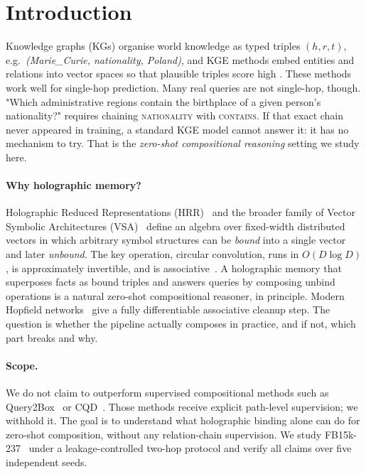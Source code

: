 \documentclass[11pt]{article}
\theoremstyle{definition}
\begin{document}
\section{Introduction}
\label{sec:intro}

Knowledge graphs (KGs) organise world knowledge as typed triples $(h, r, t)$,
e.g.\ \emph{(Marie\_Curie, nationality, Poland)}, and KGE methods embed entities
and relations into vector spaces so that plausible triples score high
\cite{bordes2013transe,yang2014distmult,trouillon2016complex,sun2019rotate}.
These methods work well for single-hop prediction. Many real queries are not
single-hop, though. "Which administrative regions contain the birthplace of
a given person's nationality?" requires chaining \textsc{nationality} with
\textsc{contains}. If that exact chain never appeared in training, a standard
KGE model cannot answer it: it has no mechanism to try. That is the
\emph{zero-shot compositional reasoning} setting we study here.

\paragraph{Why holographic memory?}
Holographic Reduced Representations
(HRR)~\cite{plate2003holographic} and the broader family of Vector Symbolic
Architectures (VSA)~\cite{kanerva2009hyperdimensional,schlegel2022comparison}
define an algebra over fixed-width distributed vectors in which arbitrary symbol
structures can be \emph{bound} into a single vector and later \emph{unbound}.
The key operation, circular convolution, runs in $O(D \log D)$, is approximately
invertible, and is associative~\cite{plate2003holographic}. A holographic memory
that superposes facts as bound triples and answers queries by composing unbind
operations is a natural zero-shot compositional reasoner, in principle. Modern
Hopfield networks~\cite{ramsauer2021hopfield} give a fully differentiable
associative cleanup step. The question is whether the pipeline actually
composes in practice, and if not, which part breaks and why.

\paragraph{Scope.}
We do not claim to outperform supervised compositional methods such as
Query2Box~\cite{ren2020query2box} or CQD~\cite{arakelyan2021complex}. Those
methods receive explicit path-level supervision; we withhold it. The goal is to
understand what holographic binding alone can do for zero-shot composition,
without any relation-chain supervision. We study FB15k-237~\cite{toutanova2015observed}
under a leakage-controlled two-hop protocol and verify all claims over five
independent seeds.
\end{document}
